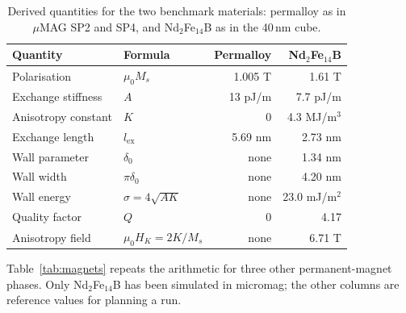 \documentclass[10pt,a4paper]{article}
\newcommand{\mo}{\mu_0}
\begin{document}
\begin{table}[h]
\centering\small
\caption{Derived quantities for the two benchmark materials: permalloy as in $\mu$MAG SP2 and SP4, and
Nd$_2$Fe$_{14}$B as in the 40\,nm cube.}
\label{tab:scales}
\begin{tabular}{@{}l l r r@{}}
\toprule
Quantity & Formula & Permalloy & Nd$_2$Fe$_{14}$B \\
\midrule
Polarisation & $\mo M_s$ & 1.005 T & 1.61 T \\
Exchange stiffness & $A$ & 13 pJ/m & 7.7 pJ/m \\
Anisotropy constant & $K$ & 0 & 4.3 MJ/m$^3$ \\
Exchange length & $l_\mathrm{ex}$ & 5.69 nm & 2.73 nm \\
Wall parameter & $\delta_0$ & none & 1.34 nm \\
Wall width & $\pi\delta_0$ & none & 4.20 nm \\
Wall energy & $\sigma = 4\sqrt{AK}$ & none & 23.0 mJ/m$^2$ \\
Quality factor & $Q$ & 0 & 4.17 \\
Anisotropy field & $\mo H_K = 2K/M_s$ & none & 6.71 T \\
\bottomrule
\end{tabular}
\end{table}

Table~\ref{tab:magnets} repeats the arithmetic for three other permanent-magnet phases. Only Nd$_2$Fe$_{14}$B has been simulated
in micromag; the other columns are reference values for planning a run.
\end{document}
